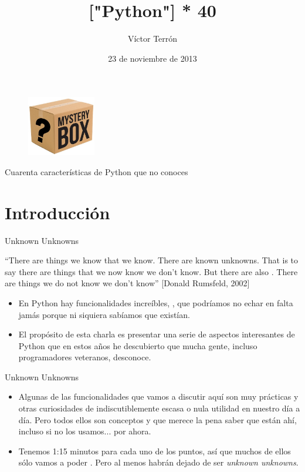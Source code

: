 \documentclass[14pt]{beamer}
\title{["Python"] * 40}
\author{Víctor Terrón}
\date{23 de noviembre de 2013}
\institute{IAA-CSIC}
\begin{document}
\begin{frame}
  \titlepage

  \begin{figure}
    \vspace{-0.5cm}
    \includegraphics[width=3cm]{pics/mistery-box.jpg}
  \end{figure}

  \footnotesize
  \begin{center}
    Cuarenta características de Python que  no conoces
  \end{center}

\end{frame}

\section{Introducción}

\begin{frame}{Unknown Unknowns}
  \small
  \begin{block}{}
    \centering
    ``There are things we know that we know. There are known
    unknowns. That is to say there are things that we now know we
    don't know. But there are also . There
    are things we do not know we don't know'' [Donald Rumsfeld, 2002]
  \end{block}

  \small
  \begin{itemize}
    \item En Python hay funcionalidades increíbles,
     , que
     podríamos no echar en falta jamás porque ni siquiera sabíamos
     que existían.
    \item El propósito de esta charla es presentar una serie de
      aspectos interesantes de Python que en estos años he descubierto
      que mucha gente, incluso programadores veteranos, desconoce.
  \end{itemize}
\end{frame}

\begin{frame}{Unknown Unknowns}
  \begin{itemize}
    \item Algunas de las funcionalidades que vamos a discutir aquí son
      muy prácticas y otras curiosidades de indiscutiblemente escasa o
      nula utilidad en nuestro día a día. Pero todos ellos son
      conceptos  y que merece la pena
      saber que están ahí, incluso si no los usamos... por ahora.
    \item Tenemos 1:15 minutos para cada uno de los puntos, así que
      muchos de ellos sólo vamos a poder . Pero al menos habrán dejado de ser \emph{unknown
      unknowns}.
  \end{itemize}
\end{frame}
\end{document}
